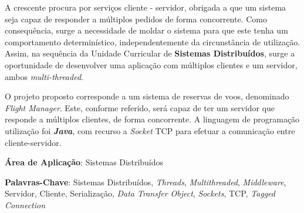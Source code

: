 \documentclass[a4paper,11pt]{article}
\begin{document}

\makecover



\renewenvironment{abstract}
{\par\noindent\textbf{\Large\abstractname}\par\bigskip}
{}

\begin{flushleft}
    \begin{abstract}
        A crescente procura por serviços cliente - servidor, obrigada a que um sistema seja capaz
        de responder a múltiplos pedidos de forma concorrente.
        Como consequência, surge a necessidade de moldar o sistema para que este tenha um comportamento
        determinístico, independentemente da circunstância de utilização.
        Assim, na sequência da Unidade Curricular de \textbf{Sistemas Distribuídos}, surge a oportunidade
        de desenvolver uma aplicação com múltiplos clientes e um servidor, ambos \textit{multi-threaded}.
        
        O projeto proposto corresponde a um sistema de reservas de voos, denominado \textit{Flight Manager}.
        Este, conforme referido, será capaz de ter um servidor que responde a múltiplos clientes, de forma
        concorrente.
        A linguagem de programação utilização foi \textbf{\textit{Java}}, com recurso a \textit{Socket} TCP
        para efetuar a comunicação entre cliente-servidor.
        
        \par \textbf{Área de Aplicação}: Sistemas Distribuídos
        \par \textbf{Palavras-Chave}: Sistemas Distribuídos, \textit{Threads}, \textit{Multithreaded}, 
        \textit{Middleware}, Servidor, Cliente, Serialização, \textit{Data Transfer Object},
        \textit{Sockets}, TCP, \textit{Tagged Connection}
    \end{abstract}
\end{flushleft}

\pagebreak
\end{document}
